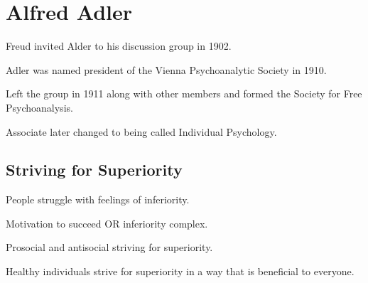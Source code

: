 \section{Alfred Adler}

\begin{coloredlist}
    \item Freud invited Alder to his discussion group in 1902.
    \item Adler was named president of the Vienna Psychoanalytic Society in 1910.
    \item Left the group in 1911 along with other members and formed the Society for Free Psychoanalysis.
    \item Associate later changed to being called Individual Psychology.
\end{coloredlist}

\subsection{Striving for Superiority}

\begin{coloredlist}
    \item People struggle with feelings of inferiority.
    \item Motivation to succeed OR inferiority complex.
    \item Prosocial and antisocial striving for superiority.
    \item Healthy individuals strive for superiority in a way that is beneficial to everyone.
\end{coloredlist}